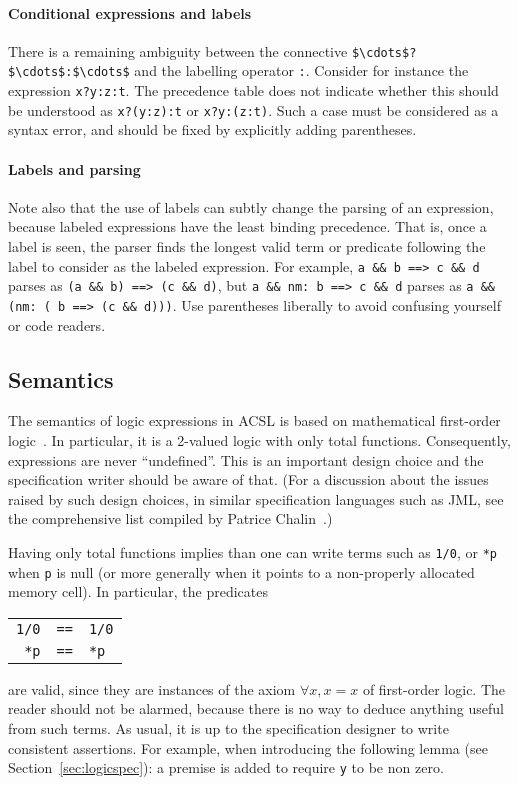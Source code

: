 \paragraph{Conditional expressions and labels}
There is a remaining ambiguity between the connective
\lstinline|$\cdots$?$\cdots$:$\cdots$| and the labelling operator
\lstinline|:|. Consider for instance the
expression \lstinline|x?y:z:t|. The precedence table does not indicate
whether this should be understood as \lstinline|x?(y:z):t| or
\lstinline|x?y:(z:t)|.
Such a case must be considered as a syntax error, and should be fixed
by explicitly adding parentheses.

\paragraph{Labels and parsing}
Note also that the use of labels can subtly change the parsing of an
expression, because labeled expressions have the least binding precedence.
That is, once a label is seen, the parser finds the longest valid term or
predicate following the label to consider as the labeled expression.
For example, \lstinline|a && b ==> c && d| parses as
\lstinline|(a && b) ==> (c && d)|, but
\lstinline|a && nm: b ==> c && d| parses as
\lstinline|a && (nm: ( b ==> (c && d)))|.
Use parentheses liberally to avoid confusing yourself or code readers.

\subsection{Semantics}
\label{sec:twovaluedlogic}

The semantics of logic expressions in ACSL is based on
mathematical first-order
logic~\cite{wikipedia-fo-logic}. In
particular, it is a 2-valued logic with only total functions. Consequently,
expressions are never ``undefined''.
This is an important design choice and the specification writer should
be aware of that. (For a discussion about the issues raised by such
design choices, in similar specification languages such as JML, see
the comprehensive list compiled by Patrice
Chalin~\cite{chalin05ftfjp,chalin07icse}.)

Having only total functions implies than one can write
terms such as \lstinline|1/0|, or \lstinline|*p| when \lstinline!p! is
null (or more
generally
when it points to a non-properly allocated memory cell). In
particular, the predicates
\begin{tabular}{rcl}
  \lstinline!1/0! &\lstinline|==|& \lstinline!1/0! \\\relax
  \lstinline!*p! &\lstinline|==|& \lstinline!*p!
\end{tabular}
are valid, since they are instances of the axiom $\forall x,
x=x$ of first-order logic. The reader should not be alarmed, because
there is no way to deduce anything useful from such terms.
As usual, it is up to the specification designer to write
consistent assertions. For example, when introducing the following lemma
(see Section~\ref{sec:logicspec}):
a premise is added to require \lstinline|y| to be non zero.


